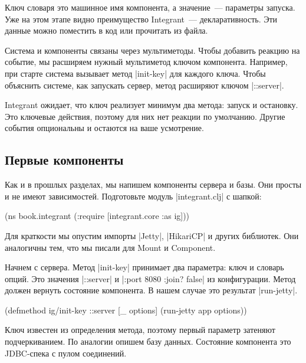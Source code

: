 Ключ словаря это машинное имя компонента, а значение~--- параметры запуска. Уже
на этом этапе видно преимущество Integrant~--- декларативность. Эти
данные можно поместить в код или прочитать из файла.

Система и компоненты связаны через мультиметоды. Чтобы добавить реакцию на
событие, мы расширяем нужный мультиметод ключом компонента. Например, при старте
система вызывает метод \spverb|init-key| для каждого ключа. Чтобы объяснить
системе, как запускать сервер, метод расширяют ключом \spverb|::server|.

Integrant ожидает, что ключ реализует минимум два метода: запуск и
остановку. Это ключевые действия, поэтому для них нет реакции по
умолчанию. Другие события опциональны и остаются на ваше усмотрение.

\subsection{Первые компоненты}

Как и в прошлых разделах, мы напишем компоненты сервера и базы. Они просты и не
имеют зависимостей. Подготовьте модуль \spverb|integrant.clj| с шапкой:

\begin{english}
  \begin{clojure}
(ns book.integrant
  (:require [integrant.core :as ig]))
  \end{clojure}
\end{english}

Для краткости мы опустим импорты \spverb|Jetty|, \spverb|HikariCP| и других
библиотек. Они аналогичны тем, что мы писали для Mount и
Component.

Начнем с сервера. Метод \spverb|init-key| принимает два параметра: ключ и
словарь опций. Это значения \spverb|::server| и \spverb|{:port 8080 :join? false}|
из конфигурации. Метод должен вернуть состояние компонента. В нашем
случае это результат \spverb|run-jetty|.

\begin{english}
  \begin{clojure}
(defmethod ig/init-key ::server
  [_ options]
  (run-jetty app options))
  \end{clojure}
\end{english}

Ключ известен из определения метода, поэтому первый параметр затеняют
подчеркиванием. По аналогии опишем базу данных. Состояние компонента это
JDBC-спека с пулом соединений.

